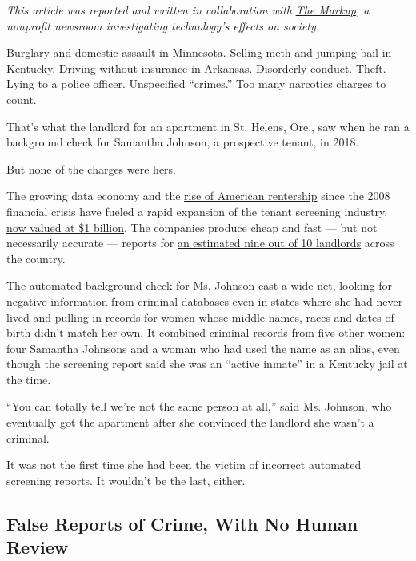 \emph{This article was reported and written in collaboration with}
\href{https://themarkup.org/locked-out/2020/05/28/access-denied-faulty-automated-background-checks-freeze-out-renters}{\emph{The
Markup}}\emph{, a nonprofit newsroom investigating technology's effects
on society.}

Burglary and domestic assault in Minnesota. Selling meth and jumping
bail in Kentucky. Driving without insurance in Arkansas. Disorderly
conduct. Theft. Lying to a police officer. Unspecified ``crimes.'' Too
many narcotics charges to count.

That's what the landlord for an apartment in St. Helens, Ore., saw when
he ran a background check for Samantha Johnson, a prospective tenant, in
2018.

But none of the charges were hers.

The growing data economy and the
\href{https://www.pewresearch.org/fact-tank/2017/07/19/more-u-s-households-are-renting-than-at-any-point-in-50-years/}{rise
of American rentership} since the 2008 financial crisis have fueled a
rapid expansion of the tenant screening industry,
\href{https://www.ibisworld.com/united-states/market-research-reports/background-check-services-industry/}{now
valued at \$1 billion}. The companies produce cheap and fast --- but not
necessarily accurate --- reports for
\href{https://www.mysmartmove.com/SmartMove/blog/landlord-rental-market-survey-insights-infographic.page}{an
estimated nine out of 10 landlords} across the country.

The automated background check for Ms. Johnson cast a wide net, looking
for negative information from criminal databases even in states where
she had never lived and pulling in records for women whose middle names,
races and dates of birth didn't match her own. It combined criminal
records from five other women: four Samantha Johnsons and a woman who
had used the name as an alias, even though the screening report said she
was an ``active inmate'' in a Kentucky jail at the time.

``You can totally tell we're not the same person at all,'' said Ms.
Johnson, who eventually got the apartment after she convinced the
landlord she wasn't a criminal.

It was not the first time she had been the victim of incorrect automated
screening reports. It wouldn't be the last, either.

\hypertarget{false-reports-of-crime-with-no-human-review}{%
\subsection{False Reports of Crime, With No Human
Review}\label{false-reports-of-crime-with-no-human-review}}

